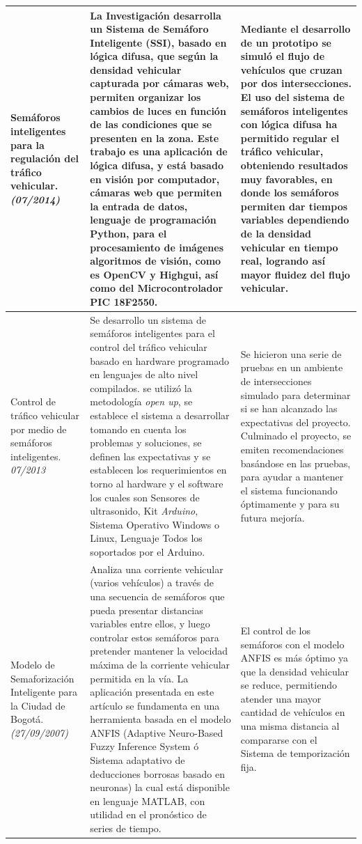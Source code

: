 \begin{center}
\begin{longtable}{|p{3.0cm}|p{7.4cm}|p{5.0cm}|}
		Semáforos inteligentes para la regulación del tráfico vehicular.\cite{bencesramos} \emph{(07/2014)}&
		La Investigación desarrolla un Sistema de Semáforo Inteligente (SSI), basado en lógica difusa, que según la densidad vehicular capturada por cámaras web, permiten organizar los cambios de luces en función de las condiciones que se presenten en la zona.
		Este trabajo es una aplicación de lógica difusa, y está basado en visión por computador, cámaras web que permiten la entrada de datos, lenguaje de programación Python, para el procesamiento de imágenes algoritmos de visión, como es OpenCV y Highgui, así como del Microcontrolador PIC 18F2550.&
		Mediante el desarrollo de un prototipo se simuló el flujo de vehículos que cruzan por dos intersecciones. El uso del sistema de semáforos inteligentes con lógica difusa ha permitido regular el tráfico vehicular, obteniendo resultados muy favorables, en donde los semáforos permiten dar tiempos variables dependiendo de la densidad vehicular en tiempo real, logrando así mayor fluidez del flujo vehicular.\\ \hline
		
		
		Control de tráfico vehicular por medio de semáforos inteligentes.\cite{MoraleslGonzales} \emph{07/2013}&
		Se desarrollo un sistema de semáforos inteligentes para el control del tráfico vehicular basado en hardware programado en lenguajes de alto nivel compilados. se utilizó la metodología \textit{open up}, se establece el sistema a desarrollar tomando en cuenta los problemas y soluciones, se definen las expectativas y se establecen los requerimientos en torno al hardware y el software los cuales son Sensores de ultrasonido, Kit \textit{Arduino}, Sistema Operativo 
		Windows o Linux, Lenguaje Todos los soportados por el Arduino.&
		Se hicieron una serie de pruebas en un ambiente de intersecciones simulado para determinar si se han alcanzado las expectativas del proyecto. Culminado el proyecto, se emiten recomendaciones basándose en las pruebas, para ayudar a mantener el sistema funcionando óptimamente y para su futura mejoría.\\ \hline
		
		Modelo de Semaforización Inteligente para la Ciudad de Bogotá. \cite{Hernandezca} \newline \emph{(27/09/2007)}&
		Analiza una corriente vehicular (varios vehículos) a través de una secuencia de semáforos que pueda presentar distancias variables entre ellos, y luego controlar estos semáforos para pretender mantener la velocidad máxima de la corriente vehicular permitida en la vía.  La aplicación presentada en este artículo se fundamenta en una herramienta basada en el modelo ANFIS (Adaptive Neuro-Based Fuzzy Inference System ó Sistema adaptativo de deducciones borrosas basado en neuronas) la cual está disponible en lenguaje MATLAB, con utilidad en el pronóstico de series de tiempo.&
		El control de los semáforos con el modelo ANFIS es más óptimo ya que la densidad vehicular se  reduce, permitiendo
		atender una mayor cantidad de vehículos en una misma distancia al compararse con el 
		Sistema de temporización fija.\\ \hline
		

\end{longtable}
\end{center}
